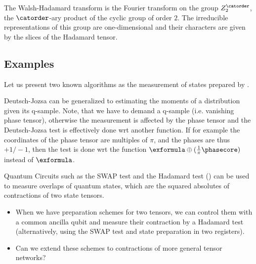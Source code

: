\begin{remark}
    The Walsh-Hadamard transform is the Fourier transform on the group $Z_2^\catorder$, the $\catorder$-ary product of the cyclic group of order $2$.
    The irreducible representations of this group are one-dimensional and their characters are given by the slices of the Hadamard tensor.
\end{remark}



\subsection{Examples}

Let us present two known algorithms as the measurement of states prepared by \computationCircuits{}.



Deutsch-Jozsa can be generalized to estimating the moments of a distribution given its q-sample.
Note, that we have to demand a q-sample (i.e. vanishing phase tensor), otherwise the measurement is affected by the phase tensor and the Deutsch-Jozsa test is effectively done wrt another function.
If for example the coordinates of the phase tensor are multiples of $\pi$, and the phases are thus $+1/-1$, then the test is done wrt the function $\exformula\oplus(\frac{1}{\pi}\phasecore)$ instead of $\exformula$.





Quantum Circuits such as the SWAP test and the Hadamard test (\cite[Section 3.6.1]{schuld_machine_2021}) can be used to measure overlaps of quantum states, which are the squared absolutes of contractions of two state tensors.
\begin{itemize}
    \item When we have preparation schemes for two tensors, we can control them with a common ancilla qubit and measure their contraction by a Hadamard test (alternatively, using the SWAP test and state preparation in two registers).
    \item Can we extend these schemes to contractions of more general tensor networks?
\end{itemize}

